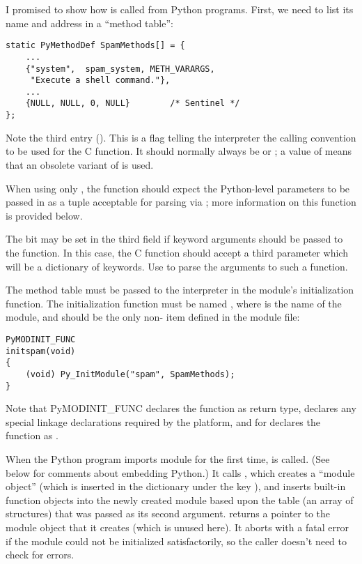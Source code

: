 I promised to show how  is called from Python
programs.  First, we need to list its name and address in a ``method
table'':

\begin{verbatim}
static PyMethodDef SpamMethods[] = {
    ...
    {"system",  spam_system, METH_VARARGS,
     "Execute a shell command."},
    ...
    {NULL, NULL, 0, NULL}        /* Sentinel */
};
\end{verbatim}

Note the third entry ().  This is a flag telling
the interpreter the calling convention to be used for the C
function.  It should normally always be  or
; a value of  means that an
obsolete variant of  is used.

When using only , the function should expect
the Python-level parameters to be passed in as a tuple acceptable for
parsing via ; more information on this
function is provided below.

The  bit may be set in the third field if
keyword arguments should be passed to the function.  In this case, the
C function should accept a third  parameter which
will be a dictionary of keywords.  Use
 to parse the arguments to
such a function.

The method table must be passed to the interpreter in the module's
initialization function.  The initialization function must be named
, where  is the name of the
module, and should be the only non- item defined in
the module file:

\begin{verbatim}
PyMODINIT_FUNC
initspam(void)
{
    (void) Py_InitModule("spam", SpamMethods);
}
\end{verbatim}

Note that PyMODINIT_FUNC declares the function as  return type, 
declares any special linkage declarations required by the platform, and for 
\Cpp{} declares the function as .

When the Python program imports module  for the first
time,  is called. (See below for comments about
embedding Python.)  It calls
, which creates a ``module object'' (which
is inserted in the dictionary  under the key
), and inserts built-in function objects into the newly
created module based upon the table (an array of 
structures) that was passed as its second argument.
 returns a pointer to the module object
that it creates (which is unused here).  It aborts with a fatal error
if the module could not be initialized satisfactorily, so the caller
doesn't need to check for errors.

